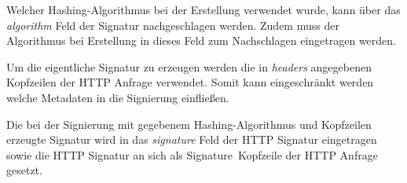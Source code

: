 {	Welcher Hashing-Algorithmus bei der Erstellung verwendet wurde, kann über das \textit{algorithm} Feld der Signatur nachgeschlagen werden. Zudem muss der Algorithmus bei Erstellung in dieses Feld zum Nachschlagen eingetragen werden.\par
	
	Um die eigentliche Signatur zu erzeugen werden die in \textit{headers} angegebenen Kopfzeilen der HTTP Anfrage verwendet. Somit kann eingeschränkt werden welche Metadaten in die Signierung einfließen.\par
	
	Die bei der Signierung mit gegebenem Hashing-Algorithmus und Kopfzeilen erzeugte Signatur wird in das \textit{signature} Feld der HTTP Signatur eingetragen sowie die HTTP Signatur an sich als \glqq Signature\grqq~Kopfzeile der HTTP Anfrage gesetzt.\cite{http-signature}\par
}
		
